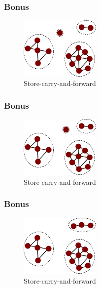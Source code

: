   \begin{frame}
    \frametitle{Bonus}
    \begin{figure}[p]
      \centering
      \includegraphics[height=3cm]{./imgs/store-carry-fwd-1.pdf}
      \caption{Store-carry-and-forward \cite{ieee12khabbaz}}
    \end{figure}
  \end{frame}
  \begin{frame}
    \frametitle{Bonus}
    \begin{figure}[p]
      \centering
      \includegraphics[height=3cm]{./imgs/store-carry-fwd-2.pdf}
      \caption{Store-carry-and-forward \cite{ieee12khabbaz}}
    \end{figure}
  \end{frame}
  \begin{frame}
    \frametitle{Bonus}
    \begin{figure}[p]
      \centering
      \includegraphics[height=3cm]{./imgs/store-carry-fwd-3.pdf}
      \caption{Store-carry-and-forward \cite{ieee12khabbaz}}
    \end{figure}
  \end{frame}


